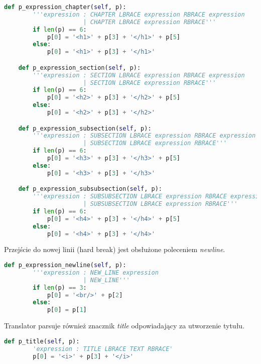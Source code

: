 \begin{lstlisting}[language={Python}, caption={Gramatyka - rozdziały, sekcje i podsekcje}, label={gramatyka-sekcje-podsekcje}]
    def p_expression_chapter(self, p):
        '''expression : CHAPTER LBRACE expression RBRACE expression
                      | CHAPTER LBRACE expression RBRACE'''
        if len(p) == 6:
            p[0] = '<h1>' + p[3] + '</h1>' + p[5]
        else:
            p[0] = '<h1>' + p[3] + '</h1>'

    def p_expression_section(self, p):
        '''expression : SECTION LBRACE expression RBRACE expression
                      | SECTION LBRACE expression RBRACE'''
        if len(p) == 6:
            p[0] = '<h2>' + p[3] + '</h2>' + p[5]
        else:
            p[0] = '<h2>' + p[3] + '</h2>'

    def p_expression_subsection(self, p):
        '''expression : SUBSECTION LBRACE expression RBRACE expression
                      | SUBSECTION LBRACE expression RBRACE'''
        if len(p) == 6:
            p[0] = '<h3>' + p[3] + '</h3>' + p[5]
        else:
            p[0] = '<h3>' + p[3] + '</h3>'

    def p_expression_subsubsection(self, p):
        '''expression : SUBSUBSECTION LBRACE expression RBRACE expression
                      | SUBSUBSECTION LBRACE expression RBRACE'''
        if len(p) == 6:
            p[0] = '<h4>' + p[3] + '</h4>' + p[5]
        else:
            p[0] = '<h4>' + p[3] + '</h4>'
\end{lstlisting}

Przejście do nowej linii (hard break) jest obsłużone poleceniem \textit{newline}.

\begin{lstlisting}[language={Python}, caption={Gramatyka - nowa linia}, label={gramatyka-nowa-linia}]
    def p_expression_newline(self, p):
        '''expression : NEW_LINE expression
                      | NEW_LINE'''
        if len(p) == 3:
            p[0] = '<br/>' + p[2]
        else:
            p[0] = p[1]
\end{lstlisting}

Translator parsuje również znacznik \textit{title} odpowiadający za utworzenie tytułu.

\begin{lstlisting}[language={Python}, caption={Gramatyka - tytuł}, label={gramatyka-tyti}]
    def p_title(self, p):
        'expression : TITLE LBRACE TEXT RBRACE'
        p[0] = '<i>' + p[3] + '</i>'
\end{lstlisting}
